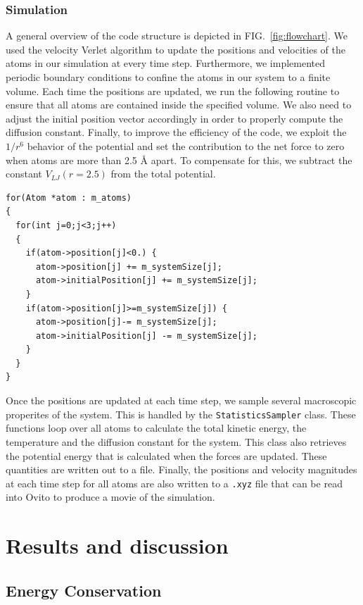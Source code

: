 \documentclass[10pt,showpacs,preprintnumbers,footinbib,amsmath,amssymb,aps,prl,twocolumn,groupedaddress,superscriptaddress,showkeys]{revtex4-1}
\begin{document}
\subsubsection*{Simulation}

A general overview of the code structure is depicted in FIG.~\ref{fig:flowchart}.
We used the velocity Verlet algorithm to update the positions and velocities of
the atoms in our simulation at every time step. Furthermore, we implemented
periodic boundary conditions to confine the atoms in our system to a finite
volume. Each time the positions are updated, we run the following routine to
ensure that all atoms are contained inside the specified volume. We also need
to adjust the initial position vector accordingly in order to properly compute the
diffusion constant. Finally, to improve the efficiency of the code, we exploit the
$1/r^6$ behavior of the potential and set the contribution to the net force to
zero when atoms are more than 2.5 {\AA} apart. To compensate for this, we
subtract the constant $V_{LJ}(r=2.5)$ from the total potential.


\begin{lstlisting}
for(Atom *atom : m_atoms)
{
  for(int j=0;j<3;j++)
  {
    if(atom->position[j]<0.) {
      atom->position[j] += m_systemSize[j];
      atom->initialPosition[j] += m_systemSize[j];
    }
    if(atom->position[j]>=m_systemSize[j]) {
      atom->position[j]-= m_systemSize[j];
      atom->initialPosition[j] -= m_systemSize[j];
    }
  }
}
\end{lstlisting}

Once the positions are updated at each time step, we sample several
macroscopic properites
of the system. This is handled by the \texttt{StatisticsSampler} class.
These functions loop over all atoms to calculate the total kinetic energy,
the
temperature and the diffusion constant for the system. This class also
retrieves the potential energy that is calculated when the forces are
updated. These quantities are written out to a file. Finally, the positions
and velocity magnitudes at each time step for all atoms are also written to
a \texttt{.xyz} file that can be read into Ovito to produce a movie of
the simulation.


\section*{Results and discussion}

\subsection*{Energy Conservation}
\end{document}
